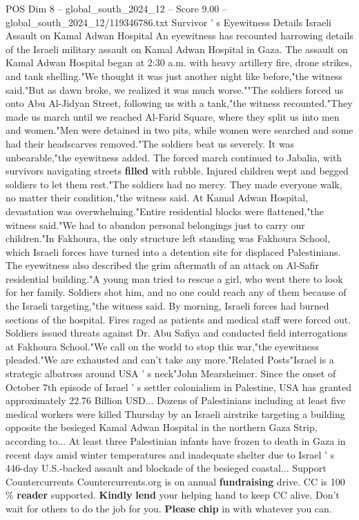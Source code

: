\begin{textsample}{POS Dim 8 – global\_south\_2024\_12 – Score 9.00 – global\_south\_2024\_12/119346786.txt}
Survivor ' s Eyewitness Details Israeli Assault on Kamal Adwan Hospital An eyewitness has recounted harrowing details of the Israeli military assault on Kamal Adwan Hospital in Gaza.
The assault on Kamal Adwan Hospital began at 2:30 a.m. with heavy artillery fire, drone strikes, and tank shelling."We thought it was just another night like before,"the witness said."But as dawn broke, we realized it was much worse.""The soldiers forced us onto Abu Al-Jidyan Street, following us with a tank,"the witness recounted."They made us march until we reached Al-Farid Square, where they split us into men and women."Men were detained in two pits, while women were searched and some had their headscarves removed."The soldiers beat us severely.
It was unbearable,"the eyewitness added.
The forced march continued to Jabalia, with survivors navigating streets \textbf{filled} with rubble.
Injured children wept and begged soldiers to let them rest."The soldiers had no mercy.
They made everyone walk, no matter their condition,"the witness said.
At Kamal Adwan Hospital, devastation was overwhelming."Entire residential blocks were flattened,"the witness said."We had to abandon personal belongings just to carry our children."In Fakhoura, the only structure left standing was Fakhoura School, which Israeli forces have turned into a detention site for displaced Palestinians.
The eyewitness also described the grim aftermath of an attack on Al-Safir residential building."A young man tried to rescue a girl, who went there to look for her family.
Soldiers shot him, and no one could reach any of them because of the Israeli targeting,"the witness said.
By morning, Israeli forces had burned sections of the hospital.
Fires raged as patients and medical staff were forced out.
Soldiers issued threats against Dr.
Abu Safiya and conducted field interrogations at Fakhoura School."We call on the world to stop this war,"the eyewitness pleaded."We are exhausted and can't take any more."Related Posts"Israel is a strategic albatross around USA ' s neck"John Mearsheimer.
Since the onset of October 7th episode of Israel ' s settler colonialism in Palestine, USA has granted approximately 22.76 Billion USD...
Dozens of Palestinians including at least five medical workers were killed Thursday by an Israeli airstrike targeting a building opposite the besieged Kamal Adwan Hospital in the northern Gaza Strip, according to...
At least three Palestinian infants have frozen to death in Gaza in recent days amid winter temperatures and inadequate shelter due to Israel ' s 446-day U.S.-backed assault and blockade of the besieged coastal...
Support Countercurrents Countercurrents.org is on annual \textbf{fundraising} drive.
CC is 100 \% \textbf{reader} supported. \textbf{Kindly} \textbf{lend} your helping hand to keep CC alive.
Don't wait for others to do the job for you. \textbf{Please} \textbf{chip} in with whatever you can.

\end{textsample}
